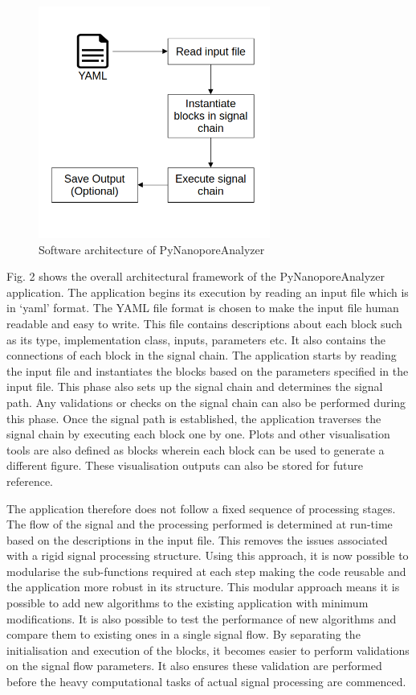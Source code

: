 \documentclass[journal]{IEEEtran}
\begin{document}
\begin{figure}[!t]
\centering
\includegraphics[width=3in]{imgs/SW-Arch.png}
\caption{Software architecture of PyNanoporeAnalyzer}
\label{fig_2}
\end{figure}

Fig. 2 shows the overall architectural framework of the PyNanoporeAnalyzer application. The application begins its execution by reading an input file which is in ‘yaml’ format. The YAML file format is chosen to make the input file human readable and easy to write. This file contains descriptions about each block such as its type, implementation class, inputs, parameters etc. It also contains the connections of each block in the signal chain. The application starts by reading the input file and instantiates the blocks based on the parameters specified in the input file. This phase also sets up the signal chain and determines the signal path. Any validations or checks on the signal chain can also be performed during this phase. Once the signal path is established, the application traverses the signal chain by executing each block one by one. Plots and other visualisation tools are also defined as blocks wherein each block can be used to generate a different figure. These visualisation outputs can also be stored for future reference.
	
The application therefore does not follow a fixed sequence of processing stages. The flow of the signal and the processing performed is determined at run-time based on the descriptions in the input file. This removes the issues associated with a rigid signal processing structure. Using this approach, it is now possible to modularise the sub-functions required at each step making the code reusable and the application more robust in its structure. This modular approach means it is possible to add new algorithms to the existing application with minimum modifications. It is also possible to test the performance of new algorithms and compare them to existing ones in a single signal flow. By separating the initialisation and execution of the blocks, it becomes easier to perform validations on the signal flow parameters. It also ensures these validation are performed before the heavy computational tasks of actual signal processing are commenced. 
\end{document}

